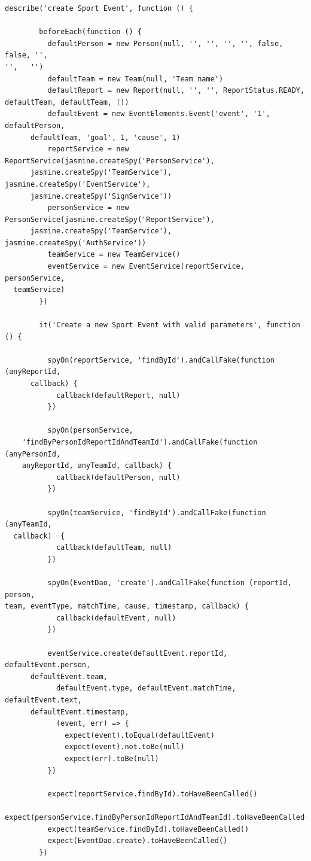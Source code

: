     \begin{lstlisting}[frame=single, caption=Exemplo de test no módulo e eventos 
utilizando Jest.]
      describe('create Sport Event', function () {

        beforeEach(function () {
          defaultPerson = new Person(null, '', '', '', '', false, false, '', 
'',   '')
          defaultTeam = new Team(null, 'Team name')
          defaultReport = new Report(null, '', '', ReportStatus.READY, 
defaultTeam, defaultTeam, [])
          defaultEvent = new EventElements.Event('event', '1', defaultPerson, 
      defaultTeam, 'goal', 1, 'cause', 1)
          reportService = new ReportService(jasmine.createSpy('PersonService'), 
      jasmine.createSpy('TeamService'), jasmine.createSpy('EventService'), 
      jasmine.createSpy('SignService'))
          personService = new PersonService(jasmine.createSpy('ReportService'), 
      jasmine.createSpy('TeamService'), jasmine.createSpy('AuthService'))
          teamService = new TeamService()
          eventService = new EventService(reportService, personService, 
  teamService)
        })

        it('Create a new Sport Event with valid parameters', function () {

          spyOn(reportService, 'findById').andCallFake(function (anyReportId, 
      callback) {
            callback(defaultReport, null)
          })

          spyOn(personService, 
    'findByPersonIdReportIdAndTeamId').andCallFake(function   (anyPersonId, 
    anyReportId, anyTeamId, callback) {
            callback(defaultPerson, null)
          })

          spyOn(teamService, 'findById').andCallFake(function (anyTeamId, 
  callback)  {
            callback(defaultTeam, null)
          })

          spyOn(EventDao, 'create').andCallFake(function (reportId, person, 
team, eventType, matchTime, cause, timestamp, callback) {
            callback(defaultEvent, null)
          })

          eventService.create(defaultEvent.reportId, defaultEvent.person, 
      defaultEvent.team,
            defaultEvent.type, defaultEvent.matchTime, defaultEvent.text, 
      defaultEvent.timestamp,
            (event, err) => {
              expect(event).toEqual(defaultEvent)
              expect(event).not.toBe(null)
              expect(err).toBe(null)
          })

          expect(reportService.findById).toHaveBeenCalled()
          
expect(personService.findByPersonIdReportIdAndTeamId).toHaveBeenCalled()
          expect(teamService.findById).toHaveBeenCalled()
          expect(EventDao.create).toHaveBeenCalled()
        })
  \end{lstlisting}

